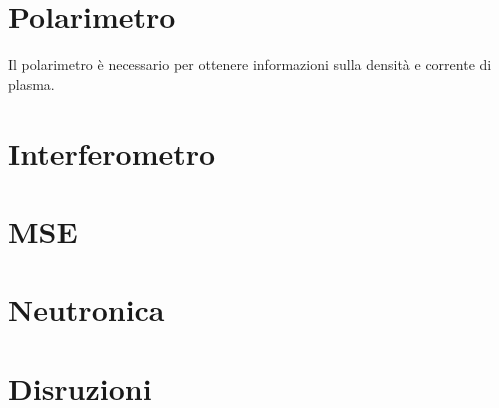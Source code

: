 \documentclass{article}
\begin{document}
\section{Polarimetro}
Il polarimetro è necessario per ottenere informazioni sulla densità e corrente di plasma.
\section{Interferometro}
\section{MSE}
\section{Neutronica}
\section{Disruzioni}
\end{document}
